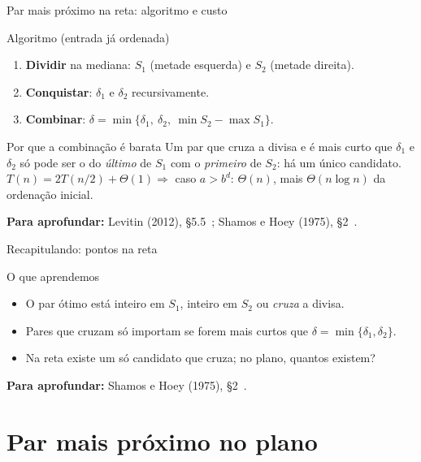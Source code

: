 \documentclass[aspectratio=169,xcolor=table]{beamer}
\newcommand{\fonte}[1]{%
  \vfill
  {\tiny\color{gray!55!black}\textbf{Para aprofundar:} #1\par}%
}
\begin{document}
\begin{frame}{Par mais próximo na reta: algoritmo e custo}
  \begin{block}{Algoritmo (entrada já ordenada)}
    \scriptsize
    \begin{enumerate}\scriptsize
      \item \textbf{Dividir} na mediana: $S_1$ (metade esquerda) e $S_2$ (metade direita).
      \item \textbf{Conquistar}: $\delta_1$ e $\delta_2$ recursivamente.
      \item \textbf{Combinar}: $\delta=\min\{\delta_1,\ \delta_2,\ \min S_2-\max S_1\}$.
    \end{enumerate}
  \end{block}
  \begin{exampleblock}{Por que a combinação é barata}
    \scriptsize Um par que cruza a divisa e é mais curto que $\delta_1$ e $\delta_2$
    só pode ser o do \emph{último} de $S_1$ com o \emph{primeiro} de $S_2$: há
    um único candidato.\\[2pt]
    $T(n)=2T(n/2)+\Theta(1)\Rightarrow$ caso $a>b^d$: $\Theta(n)$, mais $\Theta(n\log n)$ da ordenação inicial.
  \end{exampleblock}
  \fonte{Levitin (2012), \S 5.5~\cite{levitin2012introduction};
    Shamos e Hoey (1975), \S 2~\cite{shamos1975closest}.}
\end{frame}

\begin{frame}{Recapitulando: pontos na reta}
  \begin{block}{O que aprendemos}
    \begin{itemize}\small
      \item O par ótimo está inteiro em $S_1$, inteiro em $S_2$ ou \emph{cruza} a divisa.
      \item Pares que cruzam só importam se forem mais curtos que $\delta=\min\{\delta_1,\delta_2\}$.
      \item Na reta existe um só candidato que cruza; no plano, quantos existem?
    \end{itemize}
  \end{block}
  \fonte{Shamos e Hoey (1975), \S 2~\cite{shamos1975closest}.}
\end{frame}

\section{Par mais próximo no plano}
\end{document}

